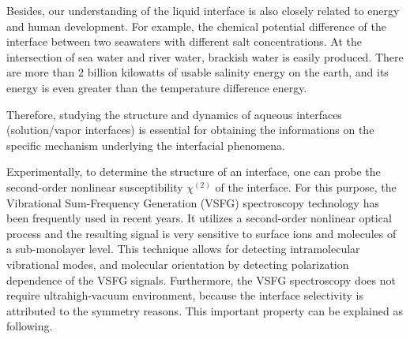 Besides, our understanding of the liquid interface is also closely related to energy and human development. 
For example, the chemical potential difference of the interface between two seawaters with different salt concentrations. 
At the intersection of sea water and river water, brackish water is easily produced. 
There are more than 2 billion kilowatts of usable salinity energy on the earth, and its energy is even greater than the temperature difference energy.

Therefore, studying the structure and dynamics of aqueous interfaces (solution/vapor interfaces) is essential for 
obtaining the informations on the specific mechanism underlying the interfacial phenomena.
 
Experimentally, to determine the structure of an interface, one can probe the second-order nonlinear susceptibility $\chi^{(2)}$ of 
the interface\cite{Shen84,Guyot-Sionnest1986,Shen2020}.
For this purpose, the Vibrational Sum-Frequency Generation (VSFG) spectroscopy technology has been frequently used in recent years.
It utilizes a second-order nonlinear optical process and the resulting signal is very sensitive to surface ions and 
molecules of a sub-monolayer level\cite{Morita2008,WangHongFei2015,WenYuChieh2016,Ishiyama2017,Penalber-Johnstone2018}. 
This technique allows for detecting intramolecular vibrational modes, and molecular orientation by detecting polarization dependence of the VSFG signals\cite{Vidal05}.  
Furthermore, the VSFG spectroscopy does not require ultrahigh-vacuum environment,
because the interface selectivity is attributed to the symmetry reasons\cite{WeiX02,Morita2018}.
This important property can be explained as following.


